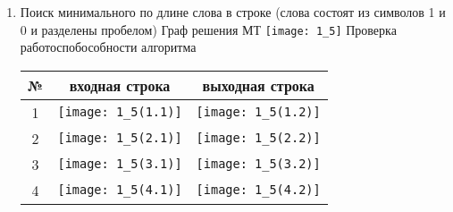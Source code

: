 \documentclass[a4paper, 12pt]{article}
\begin{document}
\begin{enumerate}
  \item Поиск минимального по длине слова в строке (слова состоят из символов 1 и 0 и разделены пробелом) 
   \newline
    Граф решения МТ
    \newline
    \texttt{[image: 1\_5]}
    \newline
    Проверка работоспобособности алгоритма
    \newline
    \begin{tabular}{|*{3}{c|}}
       \hline
       № & входная строка & выходная строка \\
       \hline
       1 & \texttt{[image: 1\_5(1.1)]} & \texttt{[image: 1\_5(1.2)]} \\ 
       \hline
       2 & \texttt{[image: 1\_5(2.1)]} & \texttt{[image: 1\_5(2.2)]} \\ 
       \hline
       3 & \texttt{[image: 1\_5(3.1)]} & \texttt{[image: 1\_5(3.2)]} \\
       \hline
       4 & \texttt{[image: 1\_5(4.1)]} & \texttt{[image: 1\_5(4.2)]} \\
       \hline
    \end{tabular}
\end{enumerate}
\end{document}
